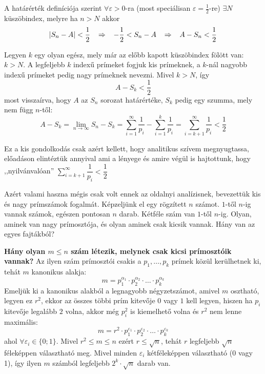 \documentclass[12pt]{book}
\theoremstyle{plain} %
\theoremstyle{definition} %
\theoremstyle{remark}
\numberwithin{equation}{section}  %
\begin{document}
	A határérték definíciója szerint $\forall \varepsilon>0$-ra (most speciálisan $\varepsilon = \frac{1}{2}$-re) $\exists N$ küszöbindex, melyre ha $n>N$ akkor
	\[  |S_n-A|<\dfrac{1}{2} \hspace{3mm} \Rightarrow \hspace{3mm} -\dfrac{1}{2} < S_n - A  \hspace{3mm} \Rightarrow \hspace{3mm} A - S_n < \dfrac{1}{2}  \]
	
	Legyen $k$ egy olyan egész, mely már az előbb kapott küszöbindex fölött van: $k>N$. A legfeljebb $k$ indexű prímeket fogjuk kis prímeknek, a $k$-nál nagyobb indexű prímeket pedig nagy prímeknek nevezni. Mivel $k>N$, így 
	\[  A - S_k <\dfrac{1}{2} \]
	most visszaírva, hogy $A$ az $S_n$ sorozat határértéke, $S_k$ pedig egy szumma, mely nem függ $n$-től:
	\[ A - S_k = \lim\limits_{n\to \infty} S_n - S_k = \sum\limits_{i=1}^{\infty} \dfrac{1}{p_i} - \sum\limits_{i=1}^{k} \dfrac{1}{p_i} = \sum\limits_{i=k+1}^{\infty} \dfrac{1}{p_i} < \dfrac{1}{2}
	\]
	
	Ez a kis gondolkodás csak azért kellett, hogy analitikus szívem megnyugtassa, előadáson elintéztük annyival ami a lényege és amire végül is hajtottunk, hogy ,,nyilvánvalóan'' $\displaystyle \sum\limits_{i=k+1}^{\infty} \dfrac{1}{p_i} < \dfrac{1}{2}$
	
	Azért valami haszna mégis csak volt ennek az oldalnyi analízisnek, bevezettük kis és nagy prímszámok fogalmát. Képzeljünk el egy rögzített $n$ számot. $1$-től $n$-ig vannak számok, egészen pontosan $n$ darab. Kétféle szám van $1$-től $n$-ig. Olyan, aminek van nagy prímosztója, és olyan aminek csak kicsik vannak. Hány van az egyes fajtákból?
	
	\textbf{Hány olyan $m\leq n$ szám létezik, melynek csak kicsi prímosztóik vannak?} Az ilyen szám prímosztói csakis a $p_1,\ldots,p_k$ prímek közül kerülhetnek ki, tehát $m$ kanonikus alakja:
	\[ m = p_1^{\alpha_1} \cdot p_2^{\alpha_2} \cdot \ldots \cdot p_k^{\alpha_k}  \]
	Emeljük ki a kanonikus alakból a legnagyobb négyzetszámot, amivel $m$ osztható, legyen ez $r^2$, ekkor az összes többi prím kitevője $0$ vagy $1$ kell legyen, hiszen ha $p_i$ kitevője legalább $2$ volna, akkor még $p_i^2$ is kiemelhető volna és $r^2$ nem lenne maximális:
	\[ m = r^2 \cdot p_1^{\varepsilon_1} \cdot p_2^{\varepsilon_2} \cdot \ldots \cdot p_k^{\varepsilon_k}  \]
	ahol $\forall \varepsilon_i \in \{ 0; 1 \}$.
	Mivel $r^2\leq m\leq n$ ezért $r\leq \sqrt{n}$, tehát $r$ legfeljebb $\sqrt{n}$ féleképpen választható meg. Mivel minden $\varepsilon_i$ kétféleképpen választható (0 vagy 1), így ilyen $m$ számból legfeljebb $2^k\cdot \sqrt{n}$ darab van.
	
\end{document}
